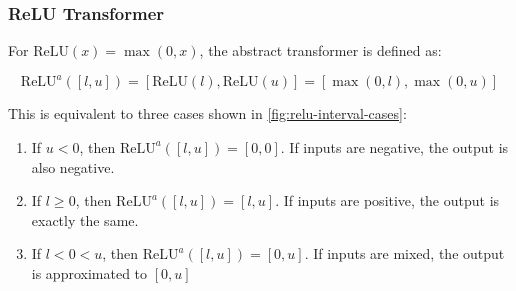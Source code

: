\documentclass[oneside,11pt,dvipsnames]{book}
\numberwithin{equation}{section}
\theoremstyle{definition}
\theoremstyle{remark}
\newcommand{\myrelu}{\mathrm{ReLU}}
\begin{document}
\subsubsection{ReLU Transformer}
For \(\myrelu(x) = \max(0, x)\), the abstract transformer is defined as:

\[
\myrelu^a([l, u]) = [ \myrelu(l), \myrelu(u)] = [\max(0, l), \max(0, u)]
\]

This is equivalent to three cases shown in \autoref{fig:relu-interval-cases}:
\begin{enumerate}
\item If $u < 0$, then $\myrelu^a([l, u]) = [0, 0]$.  If inputs are negative, the output is also negative.
\item If $l \ge 0$, then $\myrelu^a([l, u]) = [l, u]$. If inputs are positive, the output is exactly the same.
\item If $l < 0 < u$, then $\myrelu^a([l, u]) = [0, u]$. If inputs are mixed, the output is approximated to $[0, u]$

\end{enumerate}
\end{document}

